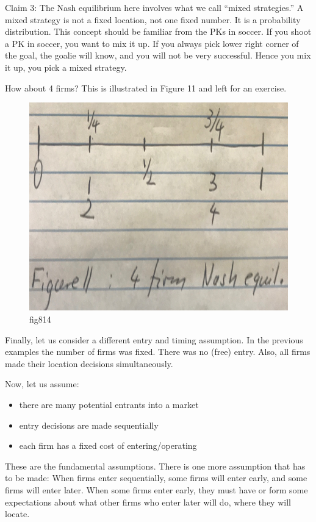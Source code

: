 \documentclass[
]{book}
\providecommand{\tightlist}{%
  \setlength{\itemsep}{0pt}\setlength{\parskip}{0pt}}
\begin{document}
Claim 3: The Nash equilibrium here involves what we call ``mixed strategies.'' A mixed strategy is not a fixed location, not one fixed number. It is a probability distribution. This concept should be familiar from the PKs in soccer. If you shoot a PK in soccer, you want to mix it up. If you always pick lower right corner of the goal, the goalie will know, and you will not be very successful. Hence you mix it up, you pick a mixed strategy.

How about 4 firms? This is illustrated in Figure 11 and left for an exercise.

\begin{figure}

{\centering \includegraphics[width=0.5\linewidth]{img/ch8/fig14} 

}

\caption{fig814}\label{fig:fig814}
\end{figure}

Finally, let us consider a different entry and timing assumption. In the previous examples the number of firms was fixed. There was no (free) entry. Also, all firms made their location decisions simultaneously.

Now, let us assume:

\begin{itemize}
\tightlist
\item
  there are many potential entrants into a market
\item
  entry decisions are made sequentially
\item
  each firm has a fixed cost of entering/operating
\end{itemize}

These are the fundamental assumptions. There is one more assumption that has to be made: When firms enter sequentially, some firms will enter early, and some firms will enter later. When some firms enter early, they must have or form some expectations about what other firms who enter later will do, where they will locate.
\end{document}
